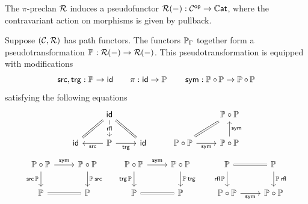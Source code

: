 The $\pi$-preclan $\RR$ induces a pseudofunctor
$\RR(-) : \CC^\op \to \tcat$,
where the contravariant action on morphisms is given by pullback.

\begin{proposition}
  Suppose $(\CC,\RR)$ has path functors.
  The functors $\arr[\Gamma]$ together form a pseudotransformation
  $\arr : \RR(-) \to \RR(-)$.
  This pseudotransformation is equipped with modifications 
  \[\src, \trg : \arr \to {\id}
  \quad \quad
  \pi : {\id} \to \arr
  \quad \quad 
  \sym : \arr \circ \arr \to \arr \circ \arr\]
  satisfying the following equations
    \[
      \begin{tikzcd}
        & \id &&& {{\arr} \circ {\arr}} \\
        \id & \arr & \id & {{\arr} \circ {\arr}} & {{\arr} \circ {\arr}}
        \arrow[equals, from=1-2, to=2-1]
        \arrow["\rfl"{description}, from=1-2, to=2-2]
        \arrow[equals, from=1-2, to=2-3]
        \arrow["\src", from=2-2, to=2-1]
        \arrow["\trg"', from=2-2, to=2-3]
        \arrow[equals, from=2-4, to=1-5]
        \arrow["\sym"', from=2-4, to=2-5]
        \arrow["\sym"', from=2-5, to=1-5]
      \end{tikzcd}
    \]
    \[ \begin{tikzcd}
	{{\arr} \circ {\arr}} & {{\arr} \circ {\arr}} & {{\arr} \circ {\arr}} & {{\arr} \circ {\arr}} & \arr & \arr \\
	\arr & \arr & \arr & \arr & {{\arr} \circ {\arr}} & {{\arr} \circ {\arr}}
	\arrow["\sym", from=1-1, to=1-2]
	\arrow["{{\src {\arr}}}"', from=1-1, to=2-1]
	\arrow["{{{\arr} \src}}", from=1-2, to=2-2]
	\arrow["\sym", from=1-3, to=1-4]
	\arrow["{{\trg {\arr}}}"', from=1-3, to=2-3]
	\arrow["{{{\arr} \trg}}", from=1-4, to=2-4]
	\arrow[equals, from=1-5, to=1-6]
	\arrow["{{\rfl {\arr}}}"', from=1-5, to=2-5]
	\arrow["{{{\arr} \rfl}}", from=1-6, to=2-6]
	\arrow[equals, from=2-1, to=2-2]
	\arrow[equals, from=2-3, to=2-4]
	\arrow["\sym"', from=2-5, to=2-6]
\end{tikzcd}\]
\end{proposition}
